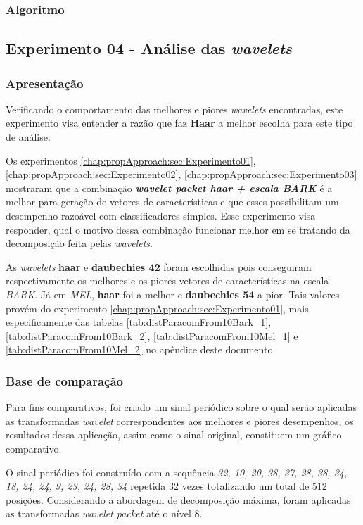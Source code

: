 			\subsubsection{Algoritmo}
				

		\subsection{Experimento 04 - Análise das \textit{wavelets}}
		\label{chap:propApproach:sec:Experimento04}
			\subsubsection{Apresentação}
				\par Verificando o comportamento das melhores e piores \textit{wavelets} encontradas, este experimento visa entender a razão que faz \textbf{Haar} a melhor escolha para este tipo de análise.
				\par Os experimentos \ref{chap:propApproach:sec:Experimento01}, \ref{chap:propApproach:sec:Experimento02}, \ref{chap:propApproach:sec:Experimento03} mostraram que a combinação \textbf{\textit{wavelet packet haar + escala BARK}} é a melhor para geração de vetores de características e que esses possibilitam um desempenho razoável com classificadores simples. Esse experimento visa responder, qual o motivo dessa combinação funcionar melhor em se tratando da decomposição feita pelas \textit{wavelets}.
				\par As \textit{wavelets} \textbf{haar} e \textbf{daubechies 42} foram escolhidas pois conseguiram respectivamente os melhores e os piores vetores de características na escala \textit{BARK}. Já em \textit{MEL}, \textbf{haar} foi a melhor e \textbf{daubechies 54} a pior. Tais valores provém do experimento \ref{chap:propApproach:sec:Experimento01}, mais especificamente das tabelas \ref{tab:distParacomFrom10Bark_1},  \ref{tab:distParacomFrom10Bark_2},  \ref{tab:distParacomFrom10Mel_1} e 	\ref{tab:distParacomFrom10Mel_2} no apêndice deste documento.
				
			\subsubsection{Base de comparação}
				\par Para fins comparativos, foi criado um sinal periódico sobre o qual serão aplicadas as transformadas \textit{wavelet} correspondentes aos melhores e piores desempenhos, os resultados dessa aplicação, assim como o sinal original, constituem um gráfico comparativo.
				\par O sinal periódico foi construído com a sequência \textit{32, 10, 20, 38, 37, 28, 38, 34, 18, 24, 24, 9, 23, 24, 28, 34} repetida 32 vezes totalizando um total de 512 posições. Considerando a abordagem de decomposição máxima, foram aplicadas as transformadas \textit{wavelet packet} até o nível 8.
